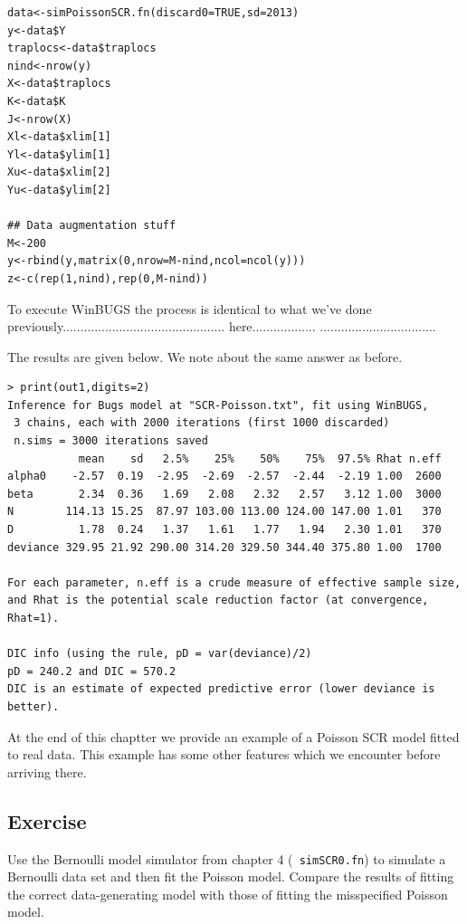 \begin{verbatim}
data<-simPoissonSCR.fn(discard0=TRUE,sd=2013)
y<-data$Y
traplocs<-data$traplocs
nind<-nrow(y)
X<-data$traplocs
K<-data$K
J<-nrow(X)
Xl<-data$xlim[1]
Yl<-data$ylim[1]
Xu<-data$xlim[2]
Yu<-data$ylim[2]

## Data augmentation stuff
M<-200
y<-rbind(y,matrix(0,nrow=M-nind,ncol=ncol(y)))
z<-c(rep(1,nind),rep(0,M-nind))
\end{verbatim}

To execute WinBUGS the process is identical to what we've done
previously..............................................
here..................
.................................

The results are given below. We note about the same answer as before.

{\small
\begin{verbatim}
> print(out1,digits=2)
Inference for Bugs model at "SCR-Poisson.txt", fit using WinBUGS,
 3 chains, each with 2000 iterations (first 1000 discarded)
 n.sims = 3000 iterations saved
           mean    sd   2.5%    25%    50%    75%  97.5% Rhat n.eff
alpha0    -2.57  0.19  -2.95  -2.69  -2.57  -2.44  -2.19 1.00  2600
beta       2.34  0.36   1.69   2.08   2.32   2.57   3.12 1.00  3000
N        114.13 15.25  87.97 103.00 113.00 124.00 147.00 1.01   370
D          1.78  0.24   1.37   1.61   1.77   1.94   2.30 1.01   370
deviance 329.95 21.92 290.00 314.20 329.50 344.40 375.80 1.00  1700

For each parameter, n.eff is a crude measure of effective sample size,
and Rhat is the potential scale reduction factor (at convergence, Rhat=1).

DIC info (using the rule, pD = var(deviance)/2)
pD = 240.2 and DIC = 570.2
DIC is an estimate of expected predictive error (lower deviance is better).
\end{verbatim}


At the end of this chaptter we provide an example of a Poisson SCR model fitted to 
real data. This example has some other features which we encounter before
arriving there. 

\subsection{Exercise}

Use the Bernoulli model simulator from chapter 4 (\mbox{\tt
  simSCR0.fn}) to simulate a Bernoulli data set and then fit the
Poisson model. Compare the results of fitting the correct
data-generating model with those of fitting the misspecified Poisson
model. 




}
